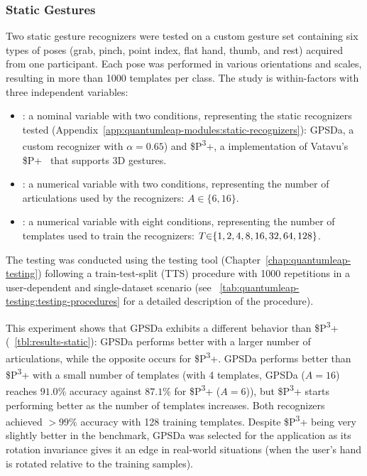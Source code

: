 \subsubsection{Static Gestures}
Two static gesture recognizers were tested on a custom gesture set containing six types of poses (grab, pinch, point index, flat hand, thumb, and rest) acquired from one participant. Each pose was performed in various orientations and scales, resulting in more than 1000 templates per class. The study is within-factors with three independent variables: 
\begin{itemize}
    \item {}: a nominal variable with two conditions, representing the static recognizers tested (Appendix~\ref{app:quantumleap-modules:static-recognizers}): GPSDa, a custom recognizer with  $\alpha{=}0.65$) and \$P\textsuperscript{3}+, a implementation of Vatavu's \$P+~\cite{Vatavu:2017a} that supports 3D gestures.
    \item {}: a numerical variable with two conditions, representing the number of articulations used by the recognizers: $A{\in}\{6,16\}$.
    \item {}: a numerical variable with eight conditions, representing the number of templates used to train the recognizers: $\splitatcommas{T{\in}\{1,2,4,8,16,32,64,128\}}$.
\end{itemize}
The testing was conducted using the \ql testing tool (Chapter~\ref{chap:quantumleap-testing}) following a train-test-split (TTS) procedure with 1000 repetitions in a user-dependent and single-dataset scenario (see \tab~\ref{tab:quantumleap-testing:testing-procedures} for a detailed description of the procedure).


This experiment shows that GPSDa exhibits a different behavior than \$P\textsuperscript{3}+ (\tab~\ref{tbl:results-static}): GPSDa performs better with a larger number of articulations, while the opposite occurs for \$P\textsuperscript{3}+. GPSDa performs better than \$P\textsuperscript{3}+ with a small number of templates (\eg with 4 templates, GPSDa ($A{=}16$) reaches $91.0\%$ accuracy against $87.1\%$ for \$P\textsuperscript{3}+ ($A{=}6$)), but \$P\textsuperscript{3}+ starts performing better as the number of templates increases. Both recognizers achieved ${>}99\%$ accuracy with 128 training templates. Despite \$P\textsuperscript{3}+ being very slightly better in the benchmark, GPSDa was selected for the \lui application as its rotation invariance gives it an edge in real-world situations (\eg when the user's hand is rotated relative to the training samples).

